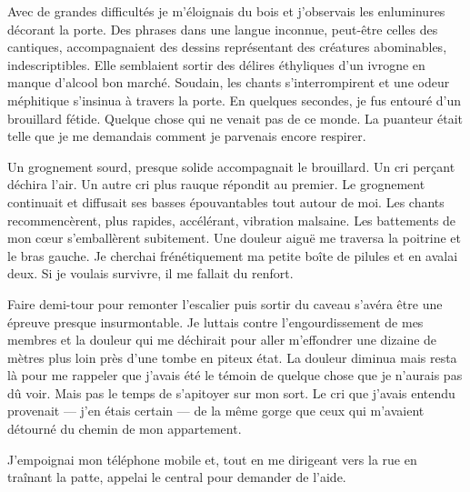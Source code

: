 Avec de grandes difficultés je m'éloignais du bois et j'observais les enluminures décorant la porte. Des phrases dans 
une langue inconnue, peut-être celles des cantiques, accompagnaient des dessins représentant des créatures abominables, 
indescriptibles. Elle semblaient sortir des délires éthyliques d'un ivrogne en manque d'alcool bon marché. Soudain, les 
chants s'interrompirent et une odeur méphitique s'insinua à travers la porte. En quelques secondes, je fus entouré 
d'un brouillard fétide. Quelque chose qui ne venait pas de ce monde. La puanteur était telle que je me demandais 
comment je parvenais encore respirer.

Un grognement sourd, presque solide accompagnait le brouillard. Un cri perçant déchira l'air. Un autre cri plus rauque 
répondit au premier. Le grognement continuait et diffusait ses basses épouvantables tout autour de moi. Les chants 
recommencèrent, plus rapides, accélérant, vibration malsaine. Les battements de mon cœur s'emballèrent subitement. Une 
douleur aiguë me traversa la poitrine et le bras gauche. Je cherchai frénétiquement ma petite boîte de pilules et en 
avalai deux. Si je voulais survivre, il me fallait du renfort.

Faire demi-tour pour remonter l'escalier puis sortir du caveau s'avéra être une épreuve presque insurmontable. Je 
luttais contre l'engourdissement de mes membres et la douleur qui me déchirait pour aller m'effondrer une dizaine de 
mètres plus loin près d'une tombe en piteux état. La douleur diminua mais resta là pour me rappeler que j'avais été le 
témoin de quelque chose que je n'aurais pas dû voir. Mais pas le temps de s'apitoyer sur mon sort. Le cri que j'avais 
entendu provenait — j'en étais certain — de la même gorge que ceux qui m'avaient détourné du chemin de mon appartement.

J'empoignai mon téléphone mobile et, tout en me dirigeant vers la rue en traînant la patte, appelai le central pour 
demander de l'aide.
